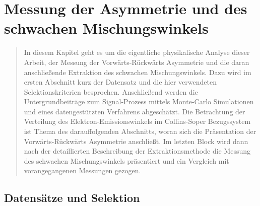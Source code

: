 


\chapter{Messung der Asymmetrie und des schwachen Mischungswinkels}
\label{afb}

\begin{quote}
    In diesem Kapitel geht es um die eigentliche physikalische Analyse dieser
    Arbeit, der Messung der Vorwärts-Rückwärts Asymmetrie und die daran
    anschließende Extraktion des schwachen Mischungswinkels. Dazu wird im
    ersten Abschnitt kurz der Datensatz und die hier verwendeten
    Selektionskriterien besprochen. Anschließend werden die Untergrundbeiträge
    zum Signal-Prozess mittels Monte-Carlo Simulationen und eines
    datengestützten Verfahrens abgeschätzt. Die Betrachtung der Verteilung des
    Elektron-Emissionswinkels im Collins-Soper Bezugssystem ist Thema des
    darauffolgenden Abschnitts, woran sich die Präsentation der
    Vorwärts-Rückwärts Asymmetrie anschließt. Im letzten Block wird dann nach
    der detaillierten Beschreibung der Extraktionsmethode die Messung des
    schwachen Mischungswinkels präsentiert und ein Vergleich mit
    vorangegangenen Messungen gezogen.
\end{quote}



\section{Datensätze und Selektion}
\label{afb:selection}



